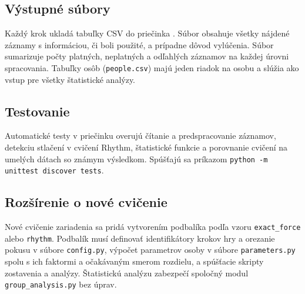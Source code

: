 \documentclass[12pt,a4paper]{article}
\begin{document}
\subsection{Výstupné súbory}

Každý krok ukladá tabuľky CSV do priečinka . Súbor  obsahuje
všetky nájdené záznamy s informáciou, či boli použité, a prípadne dôvod vylúčenia. Súbor
 sumarizuje počty platných, neplatných a odľahlých záznamov na každej úrovni spracovania.
Tabuľky osôb (\texttt{people.csv}) majú jeden riadok na osobu a slúžia ako vstup pre všetky štatistické analýzy.

\subsection{Testovanie}

Automatické testy v priečinku  overujú čítanie a predspracovanie záznamov, detekciu stlačení
v cvičení Rhythm, štatistické funkcie a porovnanie cvičení na umelých dátach so známym výsledkom. Spúšťajú sa
príkazom \texttt{python -m unittest discover tests}.

\subsection{Rozšírenie o nové cvičenie}

Nové cvičenie zariadenia sa pridá vytvorením podbalíka podľa vzoru \texttt{exact\_force} alebo \texttt{rhythm}.
Podbalík musí definovať identifikátory krokov hry a orezanie pokusu v súbore \texttt{config.py}, výpočet parametrov
osoby v súbore \texttt{parameters.py} spolu s ich faktormi a očakávaným smerom rozdielu, a spúšťacie skripty
zostavenia a analýzy. Štatistickú analýzu zabezpečí spoločný modul \texttt{group\_analysis.py} bez úprav.
\end{document}
